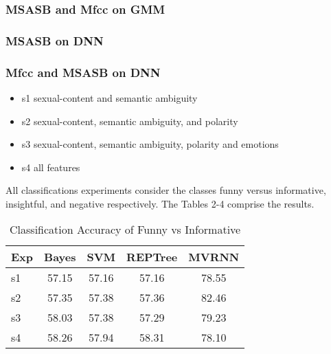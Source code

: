\documentclass{acm_proc_article-sp}
\begin{document}
\subsubsection{MSASB and Mfcc on GMM}

\subsubsection{MSASB on DNN}

\subsubsection{Mfcc and MSASB on DNN} 

\begin{itemize}  
\item s1 sexual-content and semantic ambiguity
\item s2 sexual-content, semantic ambiguity, and polarity
\item s3 sexual-content, semantic ambiguity, polarity and emotions
\item s4 all features
\end{itemize}
All classifications experiments consider the classes funny
versus informative, insightful, and negative respectively.
The Tables 2-4 comprise the results.


\begin{table}[t]
\caption{\label{}Classification Accuracy of Funny vs Informative }

\vspace{8pt} %

\centering
\begin{tabular}{|l |c |c| c| c|}
\hline%
Exp & Bayes & SVM & REPTree & MVRNN  \\
                 
\hline

s1 & 57.15 & 57.16 &57.16 & 78.55 \\
\hline
s2 & 57.35 & 57.38 &57.36 & 82.46 \\
\hline
s3 & 58.03 & 57.38 &57.29 & 79.23 \\
\hline
s4 & 58.26 & 57.94 &58.31 & 78.10 \\
\hline



\end{tabular}
\end{table}
\end{document}

